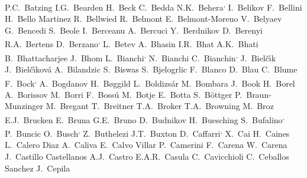 \begin{flushleft}
P.C.~Batzing\And
I.G.~Bearden\And
H.~Beck\And
C.~Bedda\And
N.K.~Behera\textsuperscript{,}\And
I.~Belikov\And
F.~Bellini\And
H.~Bello Martinez\And
R.~Bellwied\And
R.~Belmont\And
E.~Belmont-Moreno\And
V.~Belyaev\And
G.~Bencedi\And
S.~Beole\And
I.~Berceanu\And
A.~Bercuci\And
Y.~Berdnikov\And
D.~Berenyi\And
R.A.~Bertens\And
D.~Berzano\textsuperscript{,}\And
L.~Betev\And
A.~Bhasin\And
I.R.~Bhat\And
A.K.~Bhati\And
B.~Bhattacharjee\And
J.~Bhom\And
L.~Bianchi\textsuperscript{,}\And
N.~Bianchi\And
C.~Bianchin\textsuperscript{,}\And
J.~Biel\v{c}\'{\i}k\And
J.~Biel\v{c}\'{\i}kov\'{a}\And
A.~Bilandzic\And
S.~Biswas\And
S.~Bjelogrlic\And
F.~Blanco\And
D.~Blau\And
C.~Blume\And
F.~Bock\textsuperscript{,}\And
A.~Bogdanov\And
H.~B{\o}ggild\And
L.~Boldizs\'{a}r\And
M.~Bombara\And
J.~Book\And
H.~Borel\And
A.~Borissov\And
M.~Borri\And
F.~Boss\'u\And
M.~Botje\And
E.~Botta\And
S.~B\"{o}ttger\And
P.~Braun-Munzinger\And
M.~Bregant\And
T.~Breitner\And
T.A.~Broker\And
T.A.~Browning\And
M.~Broz\And
E.J.~Brucken\And
E.~Bruna\And
G.E.~Bruno\And
D.~Budnikov\And
H.~Buesching\And
S.~Bufalino\textsuperscript{,}\And
P.~Buncic\And
O.~Busch\textsuperscript{,}\And
Z.~Buthelezi\And
J.T.~Buxton\And
D.~Caffarri\textsuperscript{,}\And
X.~Cai\And
H.~Caines\And
L.~Calero Diaz\And
A.~Caliva\And
E.~Calvo Villar\And
P.~Camerini\And
F.~Carena\And
W.~Carena\And
J.~Castillo Castellanos\And
A.J.~Castro\And
E.A.R.~Casula\And
C.~Cavicchioli\And
C.~Ceballos Sanchez\And
J.~Cepila\And

\end{flushleft}

